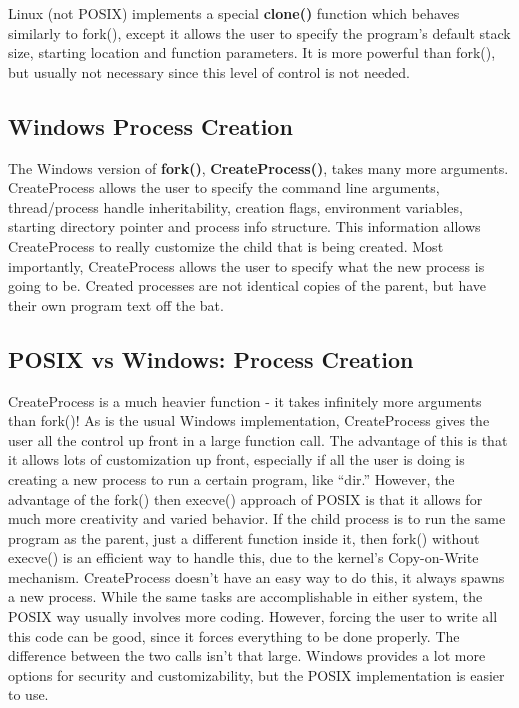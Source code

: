 \documentclass[11pt]{article}
\begin{document}
Linux (not POSIX) implements a special \textbf{clone()} function which behaves similarly to fork(), except it allows the user to specify the program's default stack size, starting location and function parameters. It is more powerful than fork(), but usually not necessary since this level of control is not needed. \\

\subsection{Windows Process Creation}
The Windows version of \textbf{fork()}, \textbf{CreateProcess()}, takes many more arguments. CreateProcess allows the user to specify the command line arguments, thread/process handle inheritability, creation flags, environment variables, starting directory pointer and process info structure. This information allows CreateProcess to really customize the child that is being created. Most importantly, CreateProcess allows the user to specify what the new process is going to be. Created processes are not identical copies of the parent, but have their own program text off the bat.

\subsection{POSIX vs Windows: Process Creation}
CreateProcess is a much heavier function - it takes infinitely more arguments than fork()! As is the usual Windows implementation, CreateProcess gives the user all the control up front in a large function call. The advantage of this is that it allows lots of customization up front, especially if all the user is doing is creating a new process to run a certain program, like ``dir.'' However, the advantage of the fork() then execve() approach of POSIX is that it allows for much more creativity and varied behavior. If the child process is to run the same program as the parent, just a different function inside it, then fork() without execve() is an efficient way to handle this, due to the kernel's Copy-on-Write mechanism. CreateProcess doesn't have an easy way to do this, it always spawns a new process. While the same tasks are accomplishable in either system, the POSIX way usually involves more coding. However, forcing the user to write all this code can be good, since it forces everything to be done properly. The difference between the two calls isn't that large. Windows provides a lot more options for security and customizability, but the POSIX implementation is easier to use. 
\end{document}
